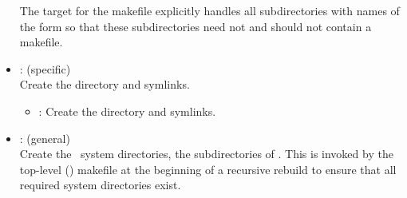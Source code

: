 \begin{itemize}
   The  target for the  makefile explicitly handles all
   subdirectories with names of the form  so that these
   subdirectories need not and should not contain a makefile.

\item
    : (specific)
   \\ Create the  directory and symlinks.
   \begin{itemize}
   \item
      : Create the  directory and symlinks.
   \end{itemize}

\item
    : (general)
   \\ Create the \aipspp\ system directories, the subdirectories of
   .  This is invoked by the top-level ()
   makefile at the beginning of a recursive rebuild to ensure that all
   required system directories exist.


\end{itemize}

